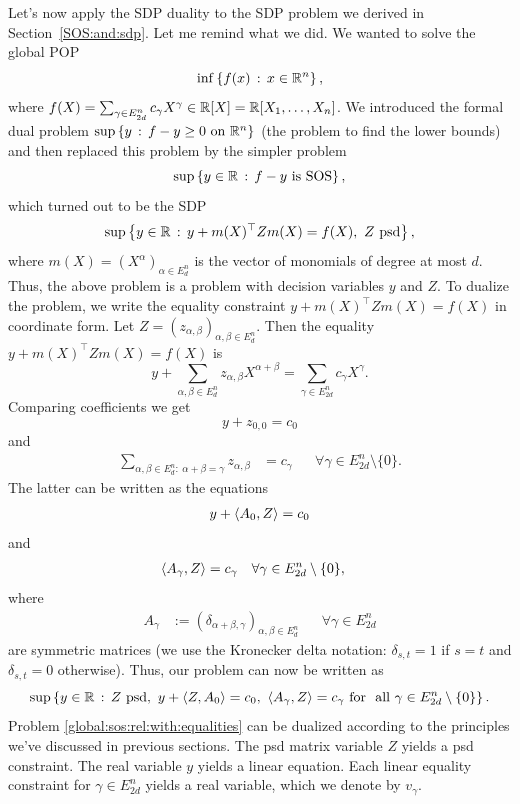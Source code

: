 Let's now apply the SDP duality to the SDP problem we derived in Section~\ref{SOS:and:sdp}. Let me remind what we did. We wanted to solve the global POP 
\begin{equation}
	\label{global:pop}
	\inf \left\{ f(x) \,:\,  x \in \mathbb{R}^n  \right\},
\end{equation}
where $f(X)= \sum_{\gamma \in E^n_{2d}} c_\gamma X^\gamma \in \mathbb{R}[X]=\mathbb{R}[X_1,\ldots,X_n]$. We introduced the formal dual problem $\sup \setcond{y}{f - y \ge 0 \ \text{on} \  \R^n}$ (the problem to find the lower bounds) and then replaced this problem by the simpler problem
\[
	\sup \left\{ y \in \mathbb{R} \,:\,  f - y \text{ is SOS} \right\}, 
\]
which turned out to be the SDP
\[
	\sup \left\{ y \in \mathbb{R} \,:\,  y + m(X)^\top Z m(X) = f(X), \ Z \ \text{psd} \right\} ,
\]
where $m(X)= (X^\alpha)_{\alpha \in E^n_d}$ is the vector of monomials of degree at most $d$.
Thus, the above problem is a problem with decision variables $y$ and $Z$. To dualize the problem, we write the equality constraint $y + m(X)^\top Z m(X) = f(X)$ in coordinate form. Let $Z=(z_{\alpha,\beta})_{\alpha,\beta \in E^n_d}$. Then the equality $y + m(X)^\top Z m(X)= f(X)$ is 
\[
	y + \sum_{\alpha,\beta \in E^n_d} z_{\alpha,\beta} X^{\alpha+\beta} = \sum_{\gamma \in E^n_{2d}} c_\gamma X^\gamma.
\]
Comparing coefficients we get
\[
	y + z_{0,0} = c_0
\] 
and 
\begin{align*}
	\sum_{\alpha,\beta \in E^n_d : \ \alpha + \beta =\gamma} z_{\alpha,\beta} &=  c_\gamma & & \forall \gamma \in E^n_{2 d} \setminus \{0\}.
\end{align*}
%
The latter can be written as the equations
\begin{align*}
	y + \left\langle A_0 , Z \right\rangle  = c_0
\end{align*}
and
\begin{align*}
	\left\langle A_\gamma , Z \right\rangle &= c_\gamma & &\forall \gamma \in E^n_{2d} \setminus \{0\},
\end{align*}
where
\begin{align*}
	A_\gamma &:= (\delta_{\alpha+\beta,\gamma})_{\alpha,\beta \in E^n_d} & & \forall \gamma \in E^n_{2d}
\end{align*}
are symmetric matrices (we use the Kronecker delta notation: $\delta_{s,t}=1$ if $s=t$ and $\delta_{s,t}=0$ otherwise).
Thus, our problem can now be written as 
%
\begin{equation}
	\label{global:sos:rel:with:equalities}
	\sup \left\{ y \in \mathbb{R} \,:\,  Z \ \text{psd}, \ y+ \left\langle Z , A_0 \right\rangle = c_0, \ \left\langle A_\gamma , Z \right\rangle = c_\gamma \ \text{for \ all} \ \gamma \in E^n_{2d} \setminus \{0\} \right\}.
\end{equation}
%
Problem \eqref{global:sos:rel:with:equalities} can be dualized according to the principles we've discussed in previous sections.  The psd matrix variable $Z$ yields a psd constraint. The real variable $y$ yields a linear equation. Each linear equality constraint for $\gamma \in E_{2d}^n$ yields a real variable, which we denote by $v_\gamma$.

